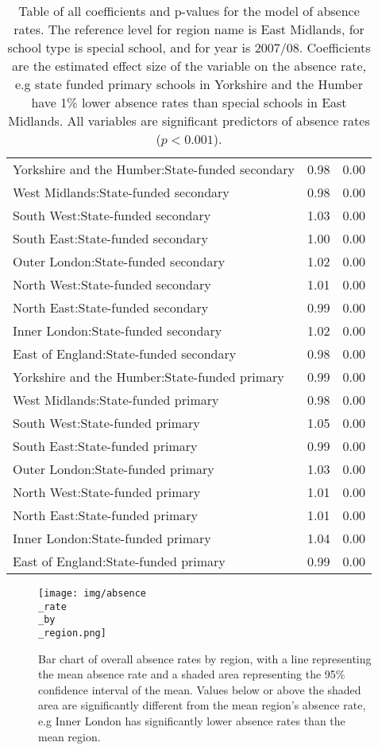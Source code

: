 \documentclass{article}
\begin{document}
\begin{longtable}{|p{}|p{}|p{}|}
        Yorkshire and the Humber:State-funded secondary & 0.98 & 0.00 \\
        West Midlands:State-funded secondary & 0.98 & 0.00 \\
        South West:State-funded secondary & 1.03 & 0.00 \\
        South East:State-funded secondary & 1.00 & 0.00 \\
        Outer London:State-funded secondary & 1.02 & 0.00 \\
        North West:State-funded secondary & 1.01 & 0.00 \\
        North East:State-funded secondary & 0.99 & 0.00 \\
        Inner London:State-funded secondary & 1.02 & 0.00 \\
        East of England:State-funded secondary & 0.98 & 0.00 \\
        \hline
        
        Yorkshire and the Humber:State-funded primary & 0.99 & 0.00 \\ 
        West Midlands:State-funded primary & 0.98 & 0.00 \\
        South West:State-funded primary & 1.05 & 0.00 \\
        South East:State-funded primary & 0.99 & 0.00 \\
        Outer London:State-funded primary & 1.03 & 0.00 \\
        North West:State-funded primary & 1.01 & 0.00 \\
        North East:State-funded primary & 1.01 & 0.00 \\
        Inner London:State-funded primary & 1.04 & 0.00 \\
        East of England:State-funded primary & 0.99 & 0.00
        \hline

        \caption{Table of all coefficients and p-values for the model of absence rates. The reference level for region name is East Midlands, for school type is special school, and for year is 2007/08. Coefficients are the estimated effect size of the variable on the absence rate, e.g state funded primary schools in Yorkshire and the Humber have 1\% lower absence rates than special schools in East Midlands. All variables are significant predictors of absence rates ($p < 0.001$).}
    \label{tab:model_output}
\end{longtable}

\begin{figure}[htbp]
    \centering
    \texttt{[image: img/absence\\\_rate\\\_by\\\_region.png]}
    \caption{Bar chart of overall absence rates by region, with a line representing the mean absence rate and a shaded area representing the 95\% confidence interval of the mean. Values below or above the shaded area are significantly different from the mean region's absence rate, e.g Inner London has significantly lower absence rates than the mean region.}
    \label{fig:absence_rate_by_region}
\end{figure}
\end{document}
